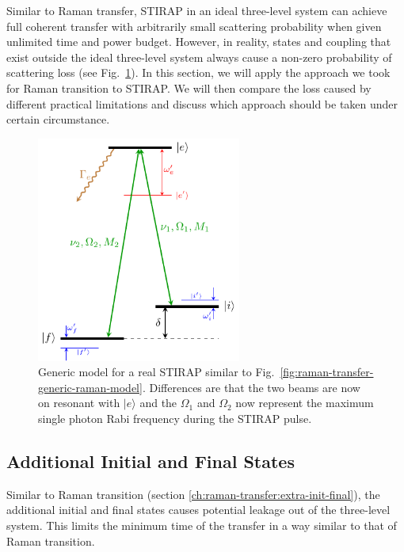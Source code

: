 Similar to Raman transfer, STIRAP in an ideal three-level system can achieve
full coherent transfer with arbitrarily small scattering probability
when given unlimited time and power budget.
However, in reality, states and coupling that exist outside the ideal three-level system
always cause a non-zero probability of scattering loss
(see Fig.~\ref{fig:raman-transfer-generic-stirap-model}).
In this section, we will apply the approach we took for Raman transition to STIRAP.
We will then compare the loss caused by different practical limitations
and discuss which approach should be taken under certain circumstance.

\begin{figure}
  \centering
  \includegraphics[width=0.6\textwidth]{figures/raman_transfer_generic_stirap_model.pdf}
  \caption[Generic model for a real STIRAP]{
    Generic model for a real STIRAP similar to Fig.~\ref{fig:raman-transfer-generic-raman-model}.
    Differences are that the two beams are now on resonant with $|e\rangle$
    and the $\Omega_1$ and $\Omega_2$ now represent the maximum single photon Rabi frequency
    during the STIRAP pulse.
    \label{fig:raman-transfer-generic-stirap-model}}
\end{figure}

\subsection{Additional Initial and Final States}

Similar to Raman transition (section \ref{ch:raman-transfer:extra-init-final}),
the additional initial and final states causes potential leakage out of the three-level system.
This limits the minimum time of the transfer in a way similar to that of Raman transition.

